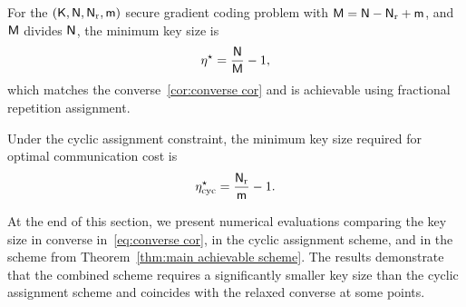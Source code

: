 \documentclass[conference,letterpaper]{IEEEtran}
\begin{document}
\begin{rem}
\label{rem:extreme cases}
\em

For the $({\sf K},{\sf N},{\sf N}_{\rm r}, {\sf m})$ secure gradient coding problem with  ${\sf M}= {\sf N} - {\sf N}_{\rm r} + {\sf m}$, and ${\sf M}$ divides ${\sf N}$, the minimum key size is
\begin{align}
    \eta^{\star} = \frac{{\sf N}}{{\sf M}} - 1, \label{eq:gradient eta rho rep}
\end{align}
which matches the converse~\eqref{cor:converse cor} and is achievable using fractional repetition assignment.

Under the cyclic assignment constraint, the minimum key size required for optimal communication cost is
\begin{align}
    \eta^{\star}_{\text{cyc}} = \frac{{\sf N}_{\rm r}}{{\sf m}} - 1. \label{eq:gradient eta cyc}
\end{align}


\end{rem}

At the end of this section, we present numerical evaluations comparing the key size in converse in~\eqref{eq:converse cor}, in the cyclic assignment scheme, and in the scheme from Theorem~\ref{thm:main achievable scheme}. %
The results demonstrate that the combined scheme requires a significantly smaller key size than the cyclic assignment scheme and coincides with the relaxed converse at some points.
\end{document}
